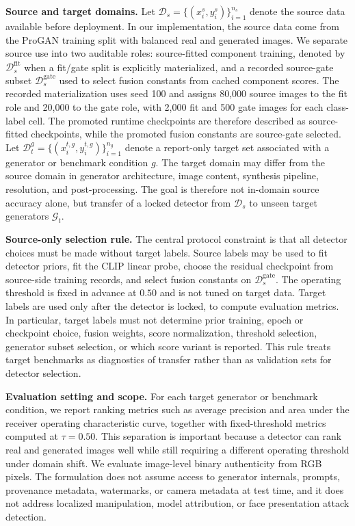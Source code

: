 \documentclass[lettersize,journal]{IEEEtran}
\begin{document}
\textbf{Source and target domains.}
Let $\mathcal{D}_{s}=\{(x_i^s,y_i^s)\}_{i=1}^{n_s}$ denote the source data available before deployment. In our implementation, the source data come from the ProGAN training split with balanced real and generated images. We separate source use into two auditable roles: source-fitted component training, denoted by $\mathcal{D}_{s}^{\mathrm{fit}}$ when a fit/gate split is explicitly materialized, and a recorded source-gate subset $\mathcal{D}_{s}^{\mathrm{gate}}$ used to select fusion constants from cached component scores. The recorded materialization uses seed 100 and assigns 80,000 source images to the fit role and 20,000 to the gate role, with 2,000 fit and 500 gate images for each class-label cell. The promoted runtime checkpoints are therefore described as source-fitted checkpoints, while the promoted fusion constants are source-gate selected. Let $\mathcal{D}_{t}^{g}=\{(x_i^{t,g},y_i^{t,g})\}_{i=1}^{n_g}$ denote a report-only target set associated with a generator or benchmark condition $g$. The target domain may differ from the source domain in generator architecture, image content, synthesis pipeline, resolution, and post-processing. The goal is therefore not in-domain source accuracy alone, but transfer of a locked detector from $\mathcal{D}_{s}$ to unseen target generators $\mathcal{G}_{t}$.

\textbf{Source-only selection rule.}
The central protocol constraint is that all detector choices must be made without target labels. Source labels may be used to fit detector priors, fit the CLIP linear probe, choose the residual checkpoint from source-side training records, and select fusion constants on $\mathcal{D}_{s}^{\mathrm{gate}}$. The operating threshold is fixed in advance at $0.50$ and is not tuned on target data. Target labels are used only after the detector is locked, to compute evaluation metrics. In particular, target labels must not determine prior training, epoch or checkpoint choice, fusion weights, score normalization, threshold selection, generator subset selection, or which score variant is reported. This rule treats target benchmarks as diagnostics of transfer rather than as validation sets for detector selection.

\textbf{Evaluation setting and scope.}
For each target generator or benchmark condition, we report ranking metrics such as average precision and area under the receiver operating characteristic curve, together with fixed-threshold metrics computed at $\tau=0.50$. This separation is important because a detector can rank real and generated images well while still requiring a different operating threshold under domain shift. We evaluate image-level binary authenticity from RGB pixels. The formulation does not assume access to generator internals, prompts, provenance metadata, watermarks, or camera metadata at test time, and it does not address localized manipulation, model attribution, or face presentation attack detection.
\end{document}
